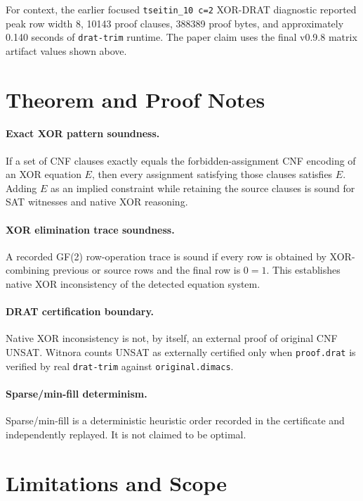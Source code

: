 \documentclass[10pt]{article}
\begin{document}
For context, the earlier focused \texttt{tseitin\_10 c=2} XOR-DRAT diagnostic
reported peak row width 8, 10143 proof clauses, 388389 proof bytes, and
approximately 0.140 seconds of \texttt{drat-trim} runtime. The paper claim uses
the final v0.9.8 matrix artifact values shown above.

\section{Theorem and Proof Notes}

\paragraph{Exact XOR pattern soundness.}
If a set of CNF clauses exactly equals the forbidden-assignment CNF encoding of
an XOR equation \(E\), then every assignment satisfying those clauses satisfies
\(E\). Adding \(E\) as an implied constraint while retaining the source clauses
is sound for SAT witnesses and native XOR reasoning.

\paragraph{XOR elimination trace soundness.}
A recorded GF(2) row-operation trace is sound if every row is obtained by
XOR-combining previous or source rows and the final row is \(0 = 1\). This
establishes native XOR inconsistency of the detected equation system.

\paragraph{DRAT certification boundary.}
Native XOR inconsistency is not, by itself, an external proof of original CNF
UNSAT. Witnora counts UNSAT as externally certified only when
\texttt{proof.drat} is verified by real \texttt{drat-trim} against
\texttt{original.dimacs}.

\paragraph{Sparse/min-fill determinism.}
Sparse/min-fill is a deterministic heuristic order recorded in the certificate
and independently replayed. It is not claimed to be optimal.

\section{Limitations and Scope}
\end{document}
